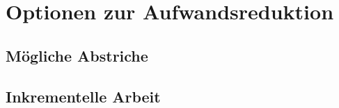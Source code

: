 \section{Optionen zur Aufwandsreduktion}

	\subsection{Mögliche Abstriche}
	
	\subsection{Inkrementelle Arbeit}
		


		